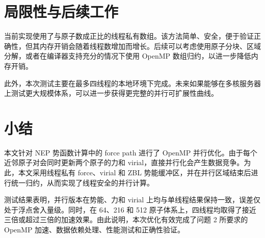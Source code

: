 \documentclass[11pt]{article}
\begin{document}
\section{局限性与后续工作}

当前实现使用了与原子数成正比的线程私有数组。该方法简单、安全，便于验证正确性，但其内存开销会随着线程数增加而增长。后续可以考虑使用原子分块、区域分解，或者在编译器支持充分的情况下使用 OpenMP 数组归约，以进一步降低内存开销。

此外，本次测试主要在最多四线程的本地环境下完成。未来如果能够在多核服务器上测试更大规模体系，可以进一步获得更完整的并行可扩展性曲线。

\section{小结}

本文针对 NEP 势函数计算中的 force path 进行了 OpenMP 并行优化。由于每个近邻原子对会同时更新两个原子的力和 virial，直接并行化会产生数据竞争。为此，本文采用线程私有 force、virial 和 ZBL 势能缓冲区，并在并行区域结束后进行统一归约，从而实现了线程安全的并行计算。

测试结果表明，并行版本在势能、力和 virial 上均与单线程结果保持一致，误差仅处于浮点舍入量级。同时，在 64、216 和 512 原子体系上，四线程均取得了接近三倍或超过三倍的加速效果。由此说明，本次优化有效完成了问题 2 所要求的 OpenMP 加速、数据依赖处理、性能测试和正确性验证。
\end{document}
